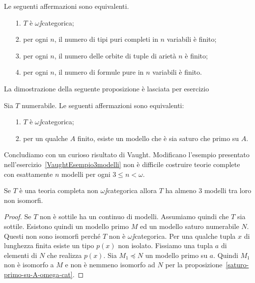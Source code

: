 \begin{corollary} Le seguenti affermazioni sono equivalenti.
\begin{itemize}
\item[1.] $T$ \`e $\omega\jj$categorica;
\item[2.] per ogni $n$, il numero di tipi puri completi in $n$ variabili \`e finito;
\item[3.] per ogni $n$, il numero delle orbite di tuple di ariet\`a $n$ \`e finito;
\item[4.] per ogni $n$, il numero di formule pure in $n$ variabili \`e finito.\QED
\end{itemize}
\end{corollary}

La dimostrazione della seguente proposizione \`e lasciata per esercizio

\begin{proposition}\label{saturo-primo-su-A-omega-cat}
Sia $T$ numerabile. Le seguenti affermazioni sono equivalenti:
\begin{itemize}
\item[1.] $T$ \`e $\omega\jj$categorica;
\item[2.] per un qualche $A$ finito, esiste un modello che \`e sia saturo che primo su $A$.\QED
\end{itemize}
\end{proposition}


Concludiamo con un curioso risultato di Vaught. Modificano l'esempio presentato nell'esercizio~\ref{VaughtEsempio3modelli} non \`e difficile costruire teorie complete con esattamente $n$ modelli per ogni $3\le n<\omega$.

\begin{proposition}\label{VaughtThm3modelli}
Se $T$ \`e una teoria completa non $\omega\jj$categorica allora $T$ ha almeno $3$ modelli tra loro non isomorfi.
\end{proposition}

\begin{proof}
Se $T$ non \`e sottile ha un continuo di modelli. Assumiamo quindi che $T$ sia sottile. Esistono quindi un modello primo $M$ ed un modello saturo numerabile $N$. Questi non sono isomorfi perch\'e $T$ non \`e $\omega\jj$categorica. Per una qualche tupla $x$ di lunghezza finita esiste un tipo $p(x)$ non isolato. Fissiamo una tupla $a$ di elementi di $N$ che realizza $p(x)$. Sia $M_1\preceq N$ un modello primo su $a$. Quindi $M_1$ non \`e isomorfo a $M$ e non \`e nemmeno isomorfo ad $N$ per la proposizione~\ref{saturo-primo-su-A-omega-cat}. 
\end{proof}




